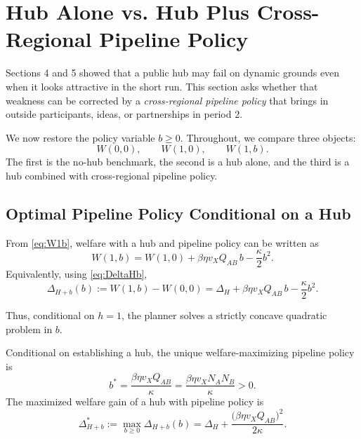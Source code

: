 \section{Hub Alone vs. Hub Plus Cross-Regional Pipeline Policy}
\label{sec:refresh}

Sections 4 and 5 showed that a public hub may fail on dynamic grounds even when it looks attractive in the short run. This section asks whether that weakness can be corrected by a \emph{cross-regional pipeline policy} that brings in outside participants, ideas, or partnerships in period 2.

We now restore the policy variable $b\ge 0$. Throughout, we compare three objects:
\[
W(0,0), \qquad W(1,0), \qquad W(1,b).
\]
The first is the no-hub benchmark, the second is a hub alone, and the third is a hub combined with cross-regional pipeline policy.

\subsection{Optimal Pipeline Policy Conditional on a Hub}

From \eqref{eq:W1b}, welfare with a hub and pipeline policy can be written as
\begin{equation}
W(1,b)
=
W(1,0)
+
\beta \eta v_X Q_{AB}\, b
-
\frac{\kappa}{2}b^2.
\label{eq:W1b_repeat}
\end{equation}
Equivalently, using \eqref{eq:DeltaHb},
\begin{equation}
\Delta_{H+b}(b)
:=
W(1,b)-W(0,0)
=
\Delta_H
+
\beta \eta v_X Q_{AB}\, b
-
\frac{\kappa}{2}b^2.
\label{eq:DeltaHb_repeat}
\end{equation}

Thus, conditional on $h=1$, the planner solves a strictly concave quadratic problem in $b$.

\begin{proposition}
\label{prop:optimal_refresh}
Conditional on establishing a hub, the unique welfare-maximizing pipeline policy is
\begin{equation}
b^*
=
\frac{\beta \eta v_X Q_{AB}}{\kappa}
=
\frac{\beta \eta v_X N_A N_B}{\kappa}
>0.
\label{eq:bstar}
\end{equation}
The maximized welfare gain of a hub with pipeline policy is
\begin{equation}
\Delta_{H+b}^*
:=
\max_{b\ge 0}\Delta_{H+b}(b)
=
\Delta_H
+
\frac{\bigl(\beta \eta v_X Q_{AB}\bigr)^2}{2\kappa}.
\label{eq:DeltaHb_star}
\end{equation}
\end{proposition}


